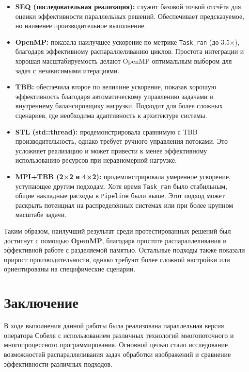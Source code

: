 \documentclass{report}
\begin{document}
\begin{itemize}
    \item \textbf{SEQ (последовательная реализация):} служит базовой точкой отсчёта для оценки эффективности параллельных решений. Обеспечивает предсказуемое, но наименее производительное выполнение.

    \item \textbf{OpenMP:} показала наилучшее ускорение по метрике \texttt{Task\_ran} (до 3.5×), благодаря эффективному распараллеливанию циклов. Простота интеграции и хорошая масштабируемость делают OpenMP оптимальным выбором для задач с независимыми итерациями.

    \item \textbf{TBB:} обеспечила второе по величине ускорение, показав хорошую эффективность благодаря автоматическому управлению задачами и внутреннему балансировщику нагрузки. Подходит для более сложных сценариев, где необходима адаптивность к архитектуре системы.

    \item \textbf{STL (std::thread):} продемонстрировала сравнимую с TBB производительность, однако требует ручного управления потоками. Это усложняет реализацию и может привести к менее эффективному использованию ресурсов при неравномерной нагрузке.

    \item \textbf{MPI+TBB (2×2 и 4×2):} продемонстрировала умеренное ускорение, уступающее другим подходам. Хотя время \texttt{Task\_ran} было стабильным, общие накладные расходы в \texttt{Pipeline} были выше. Этот подход может раскрыть потенциал на распределённых системах или при более крупном масштабе задачи.

\end{itemize}

Таким образом, наилучший результат среди протестированных решений был достигнут с помощью \textbf{OpenMP}, благодаря простоте распараллеливания и эффективной работе с разделяемой памятью. Остальные подходы также показали прирост производительности, однако требуют более сложной настройки или ориентированы на специфические сценарии.

\newpage
\section*{Заключение}
\justifying

В ходе выполнения данной работы была реализована параллельная версия оператора Собеля с использованием различных технологий многопоточного и многопроцессного программирования. Основной целью стало исследование возможностей распараллеливания задач обработки изображений и сравнение эффективности различных подходов.
\end{document}

